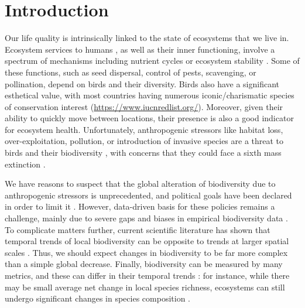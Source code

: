 \documentclass[
  12pt,
  oneside]{report}
\author{François Leroy, PhD student at CZU}
\date{2021-09-30}
\begin{document}


\cleardoublepage 
{}

{
\hypersetup{linkcolor=}
\setcounter{tocdepth}{1}
\tableofcontents
\newpage
}
\vspace{50mm}


\cleardoublepage 
{}


\hypertarget{introduction}{%
\chapter{Introduction}\label{introduction}}

Our life quality is intrinsically linked to the state of ecosystems that we live in. Ecosystem services to humans \autocite{diaz_assessing_2018}, as well as their inner functioning, involve a spectrum of mechanisms including nutrient cycles or ecosystem stability \autocite{pereira_global_2012}. Some of these functions, such as seed dispersal, control of pests, scavenging, or pollination, depend on birds and their diversity. Birds also have a significant esthetical value, with most countries having numerous iconic/charismatic species of conservation interest (\url{https://www.iucnredlist.org/}). Moreover, given their ability to quickly move between locations, their presence is also a good indicator for ecosystem health. Unfortunately, anthropogenic stressors like habitat loss, over-exploitation, pollution, or introduction of invasive species are a threat to birds and their biodiversity \autocite{donald_agricultural_2001,jiguet_population_2010}, with concerns that they could face a sixth mass extinction \autocite{barnosky_has_2011}.

We have reasons to suspect that the global alteration of biodiversity due to anthropogenic stressors is unprecedented, and political goals have been declared in order to limit it \autocite[\emph{e.g.}][]{secretariat_of_the_convention_on_biological_diversity_global_2006}. However, data-driven basis for these policies remains a challenge, mainly due to severe gaps and biases in empirical biodiversity data \autocite{meyer_global_2015}. To complicate matters further, current scientific literature has shown that temporal trends of local biodiversity can be opposite to trends at larger spatial scales \autocites[\emph{e.g.}][]{chase_species_2019,keil_biodiversity_2011,keil_spatial_2018}. Thus, we should expect changes in biodiversity to be far more complex than a simple global decrease. Finally, biodiversity can be measured by many metrics, and these can differ in their temporal trends \autocite{mcgill_fifteen_2015}: for instance, while there may be small average net change in local species richness, ecosystems can still undergo significant changes in species composition \autocite{blowes_geography_2019,dornelas_quantifying_2013,vaidyanathan_worlds_2021}.
\end{document}
